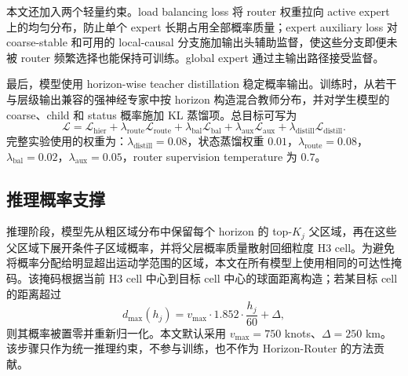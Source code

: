 本文还加入两个轻量约束。load balancing loss 将 router 权重拉向 active expert 上的均匀分布，防止单个 expert 长期占用全部概率质量；expert auxiliary loss 对 coarse-stable 和可用的 local-causal 分支施加输出头辅助监督，使这些分支即便未被 router 频繁选择也能保持可训练。global expert 通过主输出路径接受监督。

最后，模型使用 horizon-wise teacher distillation 稳定概率输出。训练时，从若干与层级输出兼容的强神经专家中按 horizon 构造混合教师分布，并对学生模型的 coarse、child 和 status 概率施加 KL 蒸馏项。总目标可写为
\begin{equation}
\mathcal{L}
=
\mathcal{L}_{\text{hier}}
+
\lambda_{\text{route}}\mathcal{L}_{\text{route}}
+
\lambda_{\text{bal}}\mathcal{L}_{\text{bal}}
+
\lambda_{\text{aux}}\mathcal{L}_{\text{aux}}
+
\lambda_{\text{distill}}\mathcal{L}_{\text{distill}}.
\end{equation}
完整实验使用的权重为：$\lambda_{\text{distill}}=0.08$，状态蒸馏权重 $0.01$，$\lambda_{\text{route}}=0.08$，$\lambda_{\text{bal}}=0.02$，$\lambda_{\text{aux}}=0.05$，router supervision temperature 为 $0.7$。

\subsection{推理概率支撑}

推理阶段，模型先从粗区域分布中保留每个 horizon 的 top-$K_j$ 父区域，再在这些父区域下展开条件子区域概率，并将父层概率质量散射回细粒度 H3 cell。为避免将概率分配给明显超出运动学范围的区域，本文在所有模型上使用相同的可达性掩码。该掩码根据当前 H3 cell 中心到目标 cell 中心的球面距离构造；若某目标 cell 的距离超过
\begin{equation}
d_{\max}(h_j)
=
v_{\max}\cdot 1.852 \cdot \frac{h_j}{60}
+
\Delta,
\end{equation}
则其概率被置零并重新归一化。本文默认采用 $v_{\max}=750$ knots、$\Delta=250$ km。该步骤只作为统一推理约束，不参与训练，也不作为 Horizon-Router 的方法贡献。
